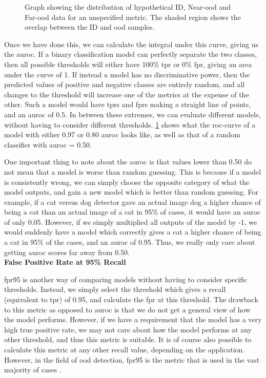 \documentclass[UKenglish]{uiomasterthesis} %
\theoremstyle{definition}
\begin{document}
\begin{figure}[H]
    \begin{center}
        
    \end{center}
    \caption[Hypothetical ID/\ac{ood} distributions for an \ac{ood} detection metric]{Graph showing the distribution of hypothetical ID, Near-\ac{ood} and Far-\ac{ood} data for an unspecified metric. The shaded region shows the overlap between the ID and \ac{ood} samples.}
    \label{fig:auroc}
\end{figure}

Once we have done this, we can calculate the integral under this curve, giving us the \ac{auroc}. If a binary classification model can perfectly separate the two classes, then all possible thresholds will either have 100\% \ac{tpr} or 0\% \ac{fpr}, giving an area under the curve of 1. If instead a model has no discriminative power, then the predicted values of positive and negative classes are entirely random, and all changes to the threshold will increase one of the metrics at the expense of the other. Such a model would have \acp{tpr} and \acp{fpr} making a straight line of points, and an \ac{auroc} of 0.5. In between these extremes, we can evaluate different models, without having to consider different thresholds. \ref{fig:auroc} shows what the \ac{roc}-curve of a model with either 0.97 or 0.80 \ac{auroc} looks like, as well as that of a random classifier with \ac{auroc} = 0.50. 

One important thing to note about the \ac{auroc} is that values lower than 0.50 do not mean that a model is worse than random guessing. This is because if a model is consistently wrong, we can simply choose the opposite category of what the model outputs, and gain a new model which is better than random guessing. For example, if a cat versus dog detector gave an actual image dog a higher chance of being a cat than an actual image of a cat in 95\% of cases, it would have an \ac{auroc} of only 0.05. However, if we simply multiplied all outputs of the model by -1, we would suddenly have a model which correctly gives a cat a higher chance of being a cat in 95\% of the cases, and an \ac{auroc} of 0.95. Thus, we really only care about getting \ac{auroc} scores far away from 0.50.\\

\noindent \textbf{False Positive Rate at 95\% Recall}

\noindent \ac{fpr95} is another way of comparing models without having to consider specific thresholds. Instead, we simply select the threshold which gives a recall (equivalent to \ac{tpr}) of 0.95, and calculate the \ac{fpr} at this threshold. The drawback to this metric as opposed to \ac{auroc} is that we do not get a general view of how the model performs. However, if we have a requirement that the model has a very high true positive rate, we may not care about how the model performs at any other threshold, and thus this metric is suitable. It is of course also possible to calculate this metric at any other recall value, depending on the application. However, in the field of \ac{ood} detection, \ac{fpr95} is the metric that is used in the vast majority of cases \cite{oodbaseline, odin, oodoverview, openood, vim}.
\end{document}
